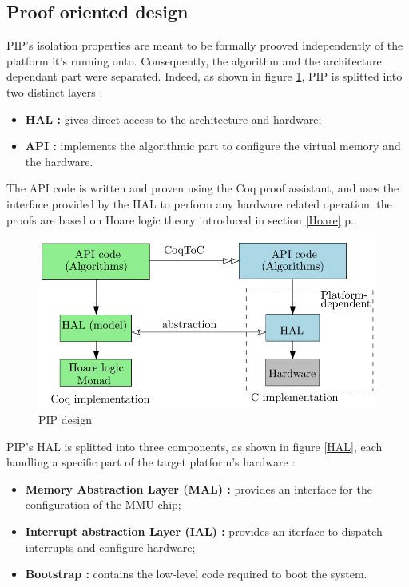 \subsection{Proof oriented design}
PIP's isolation properties are meant to be formally prooved independently of the platform it's running onto. Consequently, the algorithm and the architecture dependant part were separated. Indeed, as shown in figure \ref{design}, PIP is splitted into two distinct layers  :
\begin{itemize}
	\item \textbf{HAL :} gives direct access to the architecture and hardware;
	\item \textbf{API :} implements the algorithmic part to configure the virtual memory and the hardware.
\end{itemize}

\noindent The API code is written and proven using the Coq proof assistant, and uses the interface provided by the HAL to perform any hardware related operation. the proofs are based on Hoare logic theory introduced in section \ref{Hoare} p.\pageref{Hoare}.

\begin{figure}[!ht]  
	\centering 
	\includegraphics[width=0.8\linewidth, frame]{img/PIPDesign.png} 
	\caption{PIP design}
	\label{design}
\end{figure}

\noindent PIP's HAL is splitted into three components, as shown in figure \ref{HAL}, each handling a specific part of the target platform's hardware :
\begin{itemize}
	\item \textbf{Memory Abstraction Layer (MAL) :} provides an interface for the configuration of the MMU chip;
	\item \textbf{Interrupt abstraction Layer (IAL) :} provides an iterface to dispatch interrupts and configure hardware;
	\item \textbf{Bootstrap :} contains the low-level code required to boot the system.
\end{itemize}

